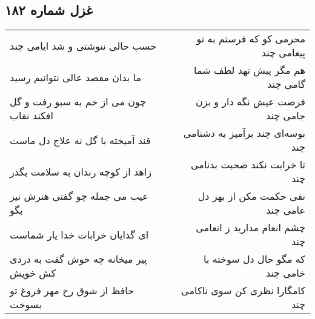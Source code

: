 \begin{center}
\section*{غزل شماره ۱۸۲}
\label{sec:sh182}
\begin{longtable}{l p{0.5cm} r}
حسب حالی ننوشتی و شد ایامی چند
&&
محرمی کو که فرستم به تو پیغامی چند
\\
ما بدان مقصد عالی نتوانیم رسید
&&
هم مگر پیش نهد لطف شما گامی چند
\\
چون می از خم به سبو رفت و گل افکند نقاب
&&
فرصت عیش نگه دار و بزن جامی چند
\\
قند آمیخته با گل نه علاج دل ماست
&&
بوسه‌ای چند برآمیز به دشنامی چند
\\
زاهد از کوچه رندان به سلامت بگذر
&&
تا خرابت نکند صحبت بدنامی چند
\\
عیب می جمله چو گفتی هنرش نیز بگو
&&
نفی حکمت مکن از بهر دل عامی چند
\\
ای گدایان خرابات خدا یار شماست
&&
چشم انعام مدارید ز انعامی چند
\\
پیر میخانه چه خوش گفت به دردی کش خویش
&&
که مگو حال دل سوخته با خامی چند
\\
حافظ از شوق رخ مهر فروغ تو بسوخت
&&
کامگارا نظری کن سوی ناکامی چند
\\
\end{longtable}
\end{center}
